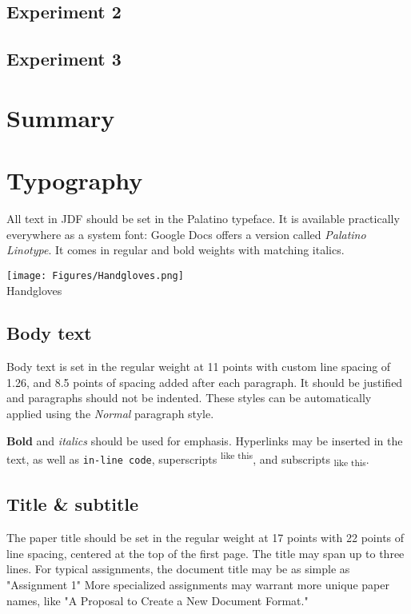 \documentclass[
	letterpaper, %
]{jdf}
\begin{document}
\subsection{Experiment 2}
\subsection{Experiment 3}

\section{Summary}









\section{Typography}
All text in JDF should be set in the Palatino typeface. It is available practically everywhere as a system font: Google Docs offers a version 
called \emph{Palatino Linotype}. It comes in regular and bold weights with matching italics.

\begin{jdffigure}
\texttt{[image: Figures/Handgloves.png]} \\
{\huge Handgloves}%
\label{fig:Palatino}%
\end{jdffigure}

\subsection{Body text}
Body text is set in the regular weight at 11 points with custom line spacing of 1.26, and 8.5 points of spacing added after each paragraph. It should be justified 
and paragraphs should not be indented. These styles can be automatically applied using the \emph{Normal} paragraph style.

\textbf{Bold} and \textit{italics} should be used for emphasis. Hyperlinks may be inserted in the text, as well as {\tt in-line code}, superscripts\textsuperscript{ like this}, 
and subscripts\textsubscript{ like this}.

\subsection{Title \& subtitle}
The paper title should be set in the regular weight at 17 points with 22 points of line spacing, centered at the top of the first page. The title may span up to three lines. 
For typical assignments, the document title may be as simple as "Assignment 1" More specialized assignments may warrant more unique paper names, like "A Proposal to Create a New Document Format."
\end{document}
